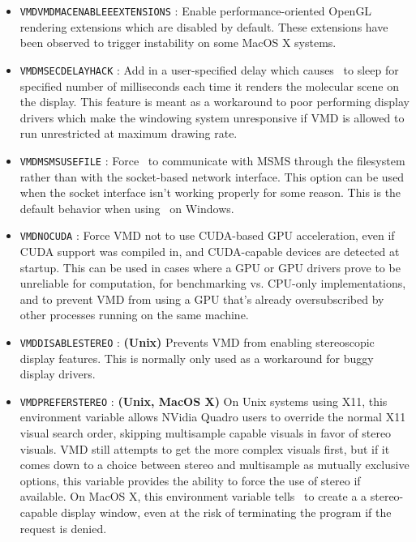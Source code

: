 \begin{itemize}
  \item {\tt VMDVMDMACENABLEEEXTENSIONS} :
   Enable performance-oriented OpenGL rendering extensions
   which are disabled by default.  These extensions have been 
   observed to trigger instability on some MacOS X systems.

  \item {\tt VMDMSECDELAYHACK} :
   Add in a user-specified delay which causes \VMD\ to sleep for
   specified number of milliseconds each time it renders the molecular
   scene on the display.  This feature is meant as a workaround to 
   poor performing display drivers which make the windowing system
   unresponsive if VMD is allowed to run unrestricted at maximum drawing rate.

  \item {\tt VMDMSMSUSEFILE} :
   Force \VMD\ to communicate with MSMS through the filesystem rather
   than with the socket-based network interface.  This option can be
   used when the socket interface isn't working properly for some reason.
   This is the default behavior when using \VMD\ on Windows.

  \item {\tt VMDNOCUDA} :
   Force VMD not to use CUDA-based GPU acceleration, even if CUDA 
   support was compiled in, and CUDA-capable devices are detected at startup.
   This can be used in cases where a GPU or GPU drivers prove to be unreliable
   for computation, for benchmarking vs. CPU-only implementations, and
   to prevent VMD from using a GPU that's already oversubscribed by other
   processes running on the same machine.

  \item {\tt VMDDISABLESTEREO} :
   {\bf (Unix)}
   Prevents VMD from enabling stereoscopic display features.  This is
   normally only used as a workaround for buggy display drivers.

  \item {\tt VMDPREFERSTEREO} :
   {\bf (Unix, MacOS X)}
   On Unix systems using X11, this environment variable allows NVidia Quadro
   users to override the normal X11 visual search order, skipping multisample
   capable visuals in favor of stereo visuals.  VMD still attempts to get the  
   more complex visuals first, but if it comes down to a choice between stereo
   and multisample as mutually exclusive options, this variable provides 
   the ability to force the use of stereo if available.
   On MacOS X, this environment variable tells \VMD\ to create a
   a stereo-capable display window, even at the risk of terminating the 
   program if the request is denied.


\end{itemize}
